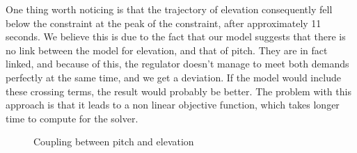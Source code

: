 One thing worth noticing is that the trajectory of elevation consequently fell below the constraint at the peak of the constraint, after approximately 11 seconds. We believe this is due to the fact that our model suggests that there is no link between the model for elevation, and that of pitch. They are in fact linked, and because of this, the regulator doesn't manage to meet both demands perfectly at the same time, and we get a deviation. If the model would include these crossing terms, the result would probably be better. The problem with this approach is that it leads to a non linear objective function, which takes longer time to compute for the solver.
\begin{figure}[htb]
    \centering
    \caption{Coupling between pitch and elevation}
    \label{fig:coupling_pitch_elev}
\end{figure}